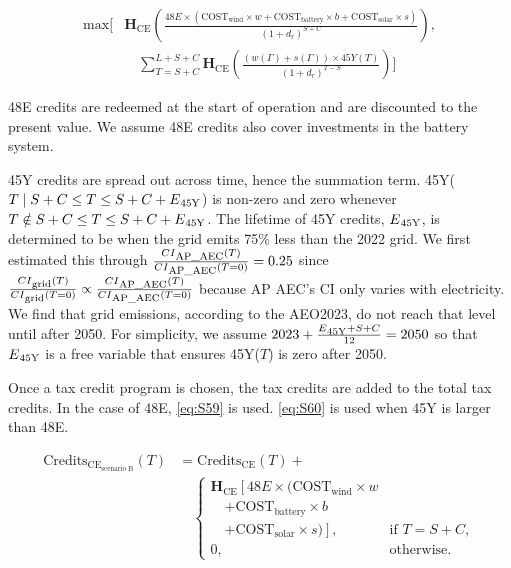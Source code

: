 \documentclass{article}
\begin{document}
\begin{equation}
\begin{aligned}
\text{max}\Bigg[& \mathbf{H}_{\text{CE}} \left(\frac{48E \times (\text{COST}_{\text{wind}} \times w + \text{COST}_{\text{battery}} \times b + \text{COST}_{\text{solar}} \times s)}{(1 + d_r)^{S+C}}\right), \\
&\quad \sum_{T=S+C}^{L+S+C} \mathbf{H}_{\text{CE}} \left(\frac{(w(\Gamma) + s(\Gamma)) \times 45Y(T)}{(1 + d_r)^{T-S}}\right) \Bigg]
\end{aligned}
\label{eq:S58}
\end{equation}

48E credits are redeemed at the start of operation and are discounted to the present value. We assume 48E credits also cover investments in the battery system.

45Y credits are spread out across time, hence the summation term. 45Y(\( T \mid S+C \leq T \leq S+C+E\textsubscript{45Y} \)) is non-zero and zero whenever \( T \notin S+C \leq T \leq S+C+E\textsubscript{45Y} \). The lifetime of 45Y credits, \( E\textsubscript{45Y} \), is determined to be when the grid emits 75\% less than the 2022 grid. We first estimated this through \( \frac{CI\textsubscript{AP\_AEC}(T)}{CI\textsubscript{AP\_AEC}(T=0)} = 0.25 \) since \( \frac{CI\textsubscript{grid}(T)}{CI\textsubscript{grid}(T=0)} \propto \frac{CI\textsubscript{AP\_AEC}(T)}{CI\textsubscript{AP\_AEC}(T=0)} \) because AP AEC’s CI only varies with electricity. We find that grid emissions, according to the AEO2023, do not reach that level until after 2050\cite{EIA2023b}. For simplicity, we assume \( 2023+\frac{E\textsubscript{45Y}+S+C}{12} = 2050 \) so that \( E\textsubscript{45Y} \) is a free variable that ensures 45Y(\( T \)) is zero after 2050.

Once a tax credit program is chosen, the tax credits are added to the total tax credits. In the case of 48E, \ref{eq:S59} is used. \ref{eq:S60} is used when 45Y is larger than 48E.


\begin{equation}
\begin{aligned}
\text{Credits}_{\text{CE}_{\text{scenario B}}}(T) &= \text{Credits}_{\text{CE}}(T) + \\
&\quad \begin{cases}
\mathbf{H}_{\text{CE}} \left[ 48E \times (\text{COST}_{\text{wind}} \times w \right. \\
\quad \left. + \text{COST}_{\text{battery}} \times b \right. \\
\quad \left. + \text{COST}_{\text{solar}} \times s) \right], & \text{if } T = S+C, \\
0, & \text{otherwise}.
\end{cases}
\end{aligned}
\label{eq:S59}
\end{equation}
\end{document}
